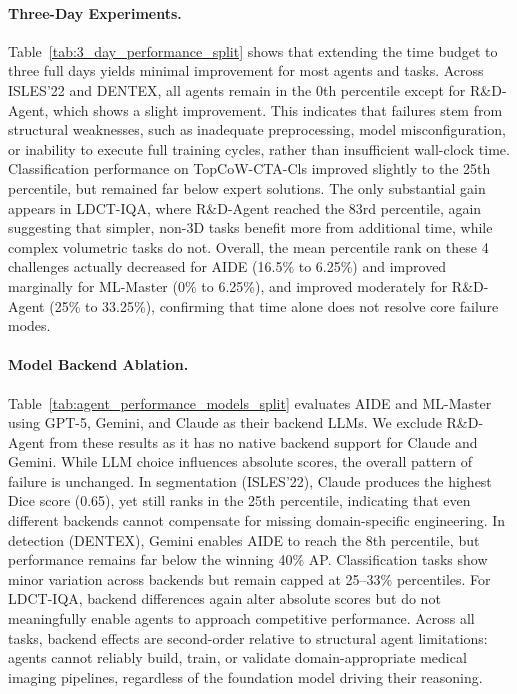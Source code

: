 \documentclass{midl} %
\begin{document}
\paragraph{Three-Day Experiments.}
Table~\ref{tab:3_day_performance_split} shows that extending the time budget to three full days yields minimal improvement for most agents and tasks. Across ISLES'22 and DENTEX, all agents remain in the 0th percentile except for R\&D-Agent, which shows a slight improvement. This indicates that failures stem from structural weaknesses, such as inadequate preprocessing, model misconfiguration, or inability to execute full training cycles, rather than insufficient wall-clock time. Classification performance on TopCoW-CTA-Cls improved slightly to the 25th percentile, but remained far below expert solutions. The only substantial gain appears in LDCT-IQA, where R$\&$D-Agent reached the 83rd percentile, again suggesting that simpler, non-3D tasks benefit more from additional time, while complex volumetric tasks do not. Overall, the mean percentile rank on these 4 challenges actually decreased for AIDE (16.5\% to 6.25\%) and improved marginally for ML-Master (0\% to 6.25\%), and improved moderately for R\&D-Agent (25\% to 33.25\%), confirming that time alone does not resolve core failure modes. %


\paragraph{Model Backend Ablation.}
Table~\ref{tab:agent_performance_models_split} evaluates AIDE and ML-Master using GPT-5, Gemini, and Claude as their backend LLMs. We exclude R\&D-Agent from these results as it has no native backend support for Claude and Gemini. While LLM choice influences absolute scores, the overall pattern of failure is unchanged. In segmentation (ISLES’22), Claude produces the highest Dice score (0.65), yet still ranks in the 25th percentile, indicating that even different backends cannot compensate for missing domain-specific engineering. In detection (DENTEX), Gemini enables AIDE to reach the 8th percentile, but performance remains far below the winning 40\% AP. Classification tasks show minor variation across backends but remain capped at 25--33\% percentiles. For LDCT-IQA, backend differences again alter absolute scores but do not meaningfully enable agents to approach competitive performance. Across all tasks, backend effects are second-order relative to structural agent limitations: agents cannot reliably build, train, or validate domain-appropriate medical imaging pipelines, regardless of the foundation model driving their reasoning.
\end{document}
